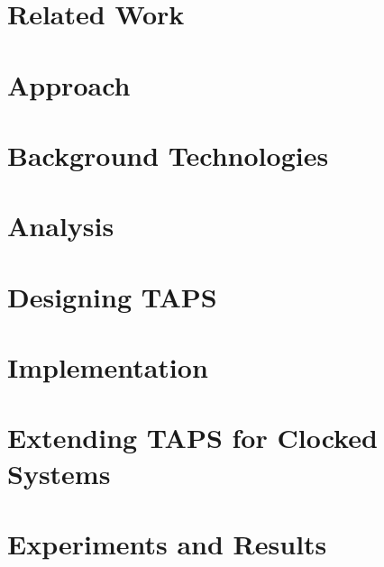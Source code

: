 \documentclass[a4paper]{report}
\begin{document}
\newpage
\tableofcontents

\newpage
{}


% 

\chapter{Related Work}
\label{chap:related_work}


\chapter{Approach}


\chapter{Background Technologies}
\label{chap:background}


\chapter{Analysis}
\label{chap:analysis}


\chapter{Designing TAPS}
\label{chap:design}


\chapter{Implementation}
\label{chap:implementation}


\chapter{Extending TAPS for Clocked Systems}
\label{chap:clock}


\chapter{Experiments and Results}
\label{chap:exp}

\end{document}
